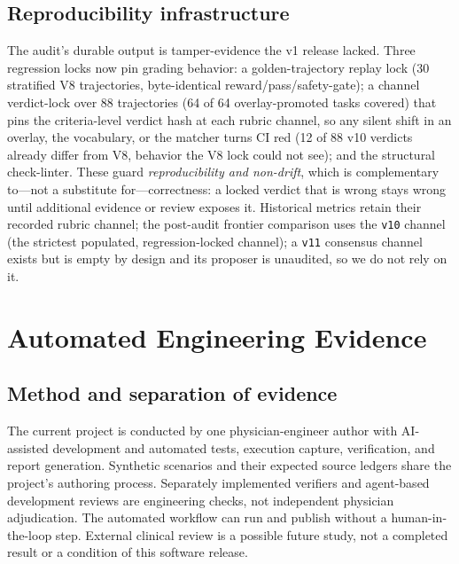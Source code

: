 \subsection{Reproducibility infrastructure}
\label{sec:repro-infra}

The audit's durable output is tamper-evidence the v1 release lacked. Three
regression locks now pin grading behavior: a golden-trajectory replay lock
(30 stratified V8 trajectories, byte-identical reward/pass/safety-gate);
a channel verdict-lock over 88 trajectories (64 of 64 overlay-promoted tasks
covered) that pins the criteria-level verdict hash at each rubric channel, so
any silent shift in an overlay, the vocabulary, or the matcher turns CI red
(12 of 88 v10 verdicts already differ from V8, behavior the V8 lock could not
see); and the structural check-linter. These guard \emph{reproducibility and
non-drift}, which is complementary to---not a substitute for---correctness: a
locked verdict that is wrong stays wrong until additional evidence or
review exposes it. Historical metrics retain their recorded rubric channel;
the post-audit frontier comparison uses the \texttt{v10} channel (the
strictest populated, regression-locked channel); a \texttt{v11} consensus
channel exists but is empty by design and its proposer is unaudited, so we do
not rely on it.

\section{Automated Engineering Evidence}
\label{sec:engineering}

\subsection{Method and separation of evidence}
The current project is conducted by one physician-engineer author with
AI-assisted development and automated tests, execution capture, verification,
and report generation. Synthetic scenarios and their expected source ledgers
share the project's authoring process. Separately implemented verifiers and
agent-based development reviews are engineering checks, not independent
physician adjudication. The automated workflow can run and publish without a
human-in-the-loop step. External clinical review is a possible future study,
not a completed result or a condition of this software release.

